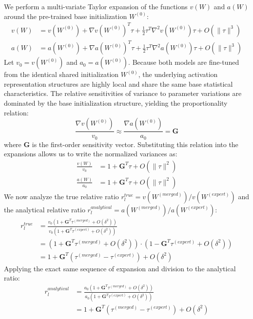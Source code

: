 \documentclass{article}
\theoremstyle{plain}
\theoremstyle{definition}
\theoremstyle{remark}
\begin{document}
We perform a multi-variate Taylor expansion of the functions $v(W)$ and $a(W)$ around the pre-trained base initialization $W^{(0)}$:
\begin{align}
    v(W) &= v(W^{(0)}) + \nabla v(W^{(0)})^T \tau + \frac{1}{2} \tau^T \nabla^2 v(W^{(0)}) \tau + O(\|\tau\|^3) \\
    a(W) &= a(W^{(0)}) + \nabla a(W^{(0)})^T \tau + \frac{1}{2} \tau^T \nabla^2 a(W^{(0)}) \tau + O(\|\tau\|^3)
\end{align}
Let $v_0 = v(W^{(0)})$ and $a_0 = a(W^{(0)})$. Because both models are fine-tuned from the identical shared initialization $W^{(0)}$, the underlying activation representation structures are highly local and share the same base statistical characteristics. The relative sensitivities of variance to parameter variations are dominated by the base initialization structure, yielding the proportionality relation:
\begin{equation}
    \frac{\nabla v(W^{(0)})}{v_0} \approx \frac{\nabla a(W^{(0)})}{a_0} = \mathbf{G}
\end{equation}
where $\mathbf{G}$ is the first-order sensitivity vector. Substituting this relation into the expansions allows us to write the normalized variances as:
\begin{align}
    \frac{v(W)}{v_0} &= 1 + \mathbf{G}^T \tau + O(\|\tau\|^2) \\
    \frac{a(W)}{a_0} &= 1 + \mathbf{G}^T \tau + O(\|\tau\|^2)
\end{align}
We now analyze the true relative ratio $r^{true}_l = v(W^{(merged)}) / v(W^{(expert)})$ and the analytical relative ratio $r^{analytical}_l = a(W^{(merged)}) / a(W^{(expert)})$:
\begin{align}
    r^{true}_l &= \frac{v_0 \left(1 + \mathbf{G}^T \tau^{(merged)} + O(\delta^2)\right)}{v_0 \left(1 + \mathbf{G}^T \tau^{(expert)} + O(\delta^2)\right)} \nonumber \\
    &= \left(1 + \mathbf{G}^T \tau^{(merged)} + O(\delta^2)\right) \cdot \left(1 - \mathbf{G}^T \tau^{(expert)} + O(\delta^2)\right) \nonumber \\
    &= 1 + \mathbf{G}^T (\tau^{(merged)} - \tau^{(expert)}) + O(\delta^2)
\end{align}
Applying the exact same sequence of expansion and division to the analytical ratio:
\begin{align}
    r^{analytical}_l &= \frac{a_0 \left(1 + \mathbf{G}^T \tau^{(merged)} + O(\delta^2)\right)}{a_0 \left(1 + \mathbf{G}^T \tau^{(expert)} + O(\delta^2)\right)} \nonumber \\
    &= 1 + \mathbf{G}^T (\tau^{(merged)} - \tau^{(expert)}) + O(\delta^2)
\end{align}
\end{document}
